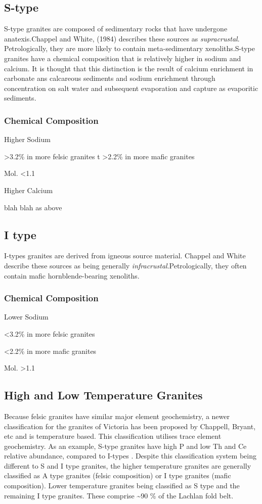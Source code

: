 \documentclass[a4paper]{article}
\begin{document}
\subsection{S-type}
S-type granites are composed of sedimentary rocks that have undergone anatexis.Chappel and White, (1984) describes these sources as \textit{supracrustal}.
Petrologically, they are more likely to contain meta-sedimentary xenoliths.S-type granites have a chemical composition that is relatively higher in sodium and calcium. It is thought that this distinction is the result of calcium enrichment in carbonate ans calcareous sediments and sodium enrichment through concentration on salt water and subsequent evaporation and capture as evaporitic sediments. 

\subsubsection{Chemical Composition}
Higher Sodium

 \textgreater 3.2\% in more felsic granites
t
 \textgreater 2.2\% in more mafic granites

Mol.  \textless 1.1

Higher Calcium

blah blah as above

\subsection{I type}
I-types granites are derived from igneous source material. Chappel and White describe these sources as being generally \textit{infracrustal}.Petrologically, they often contain mafic hornblende-bearing xenoliths.

\subsubsection{Chemical Composition}
Lower Sodium

 \textless 3.2\% in more felsic granites

 \textless 2.2\% in more mafic granites

Mol.  \textgreater 1.1

\subsection{High and Low Temperature Granites}
Because felsic granites have similar major element geochemistry, a newer classification for the granites of Victoria has been proposed by Chappell, Bryant, etc and is temperature based. This classification utilises trace element geochemistry. As an example, S-type granites have high P and low Th and Ce relative abundance, compared to I-types \cite{chappell1998high}. Despite this classification system being different to S and I type granites, the higher temperature granites are generally classified as A type granites (felsic composition) or I type granites (mafic composition). Lower temperature granites being classified as S type and the remaining I type granites. These comprise \textasciitilde 90 \% of the Lachlan fold belt. \cite{chappell2001two}
\end{document}
